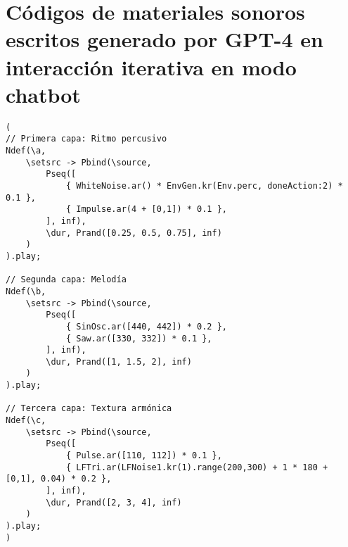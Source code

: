 \section{Códigos de materiales sonoros escritos generado por GPT-4 en interacción iterativa en modo chatbot}

\begin{minipage}[t]{1\textwidth}
    \centering
    \begin{lstlisting}[style=SuperCollider-IDE, basicstyle=\footnotesize\ttfamily, numbers=none]
(
// Primera capa: Ritmo percusivo
Ndef(\a,
    \setsrc -> Pbind(\source,
        Pseq([
            { WhiteNoise.ar() * EnvGen.kr(Env.perc, doneAction:2) * 0.1 },
            { Impulse.ar(4 + [0,1]) * 0.1 },
        ], inf),
        \dur, Prand([0.25, 0.5, 0.75], inf)
    )
).play;

// Segunda capa: Melodía
Ndef(\b,
    \setsrc -> Pbind(\source,
        Pseq([
            { SinOsc.ar([440, 442]) * 0.2 },
            { Saw.ar([330, 332]) * 0.1 },
        ], inf),
        \dur, Prand([1, 1.5, 2], inf)
    )
).play;

// Tercera capa: Textura armónica
Ndef(\c,
    \setsrc -> Pbind(\source,
        Pseq([
            { Pulse.ar([110, 112]) * 0.1 },
            { LFTri.ar(LFNoise1.kr(1).range(200,300) + 1 * 180 + [0,1], 0.04) * 0.2 },
        ], inf),
        \dur, Prand([2, 3, 4], inf)
    )
).play;
)     
    \end{lstlisting}
    \vspace{1cm}
\end{minipage}







